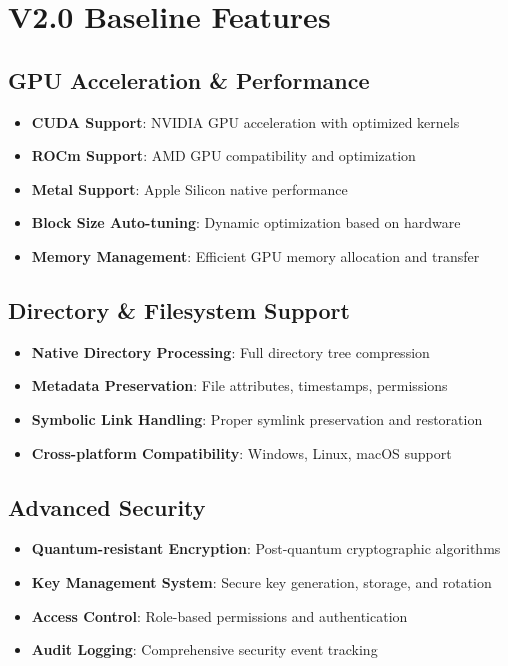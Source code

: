\documentclass[12pt,a4paper]{article}
\begin{document}
\section{V2.0 Baseline Features}

\subsection{GPU Acceleration \& Performance}
\begin{itemize}
    \item \textbf{CUDA Support}: NVIDIA GPU acceleration with optimized kernels
    \item \textbf{ROCm Support}: AMD GPU compatibility and optimization
    \item \textbf{Metal Support}: Apple Silicon native performance
    \item \textbf{Block Size Auto-tuning}: Dynamic optimization based on hardware
    \item \textbf{Memory Management}: Efficient GPU memory allocation and transfer
\end{itemize}

\subsection{Directory \& Filesystem Support}
\begin{itemize}
    \item \textbf{Native Directory Processing}: Full directory tree compression
    \item \textbf{Metadata Preservation}: File attributes, timestamps, permissions
    \item \textbf{Symbolic Link Handling}: Proper symlink preservation and restoration
    \item \textbf{Cross-platform Compatibility}: Windows, Linux, macOS support
\end{itemize}

\subsection{Advanced Security}
\begin{itemize}
    \item \textbf{Quantum-resistant Encryption}: Post-quantum cryptographic algorithms
    \item \textbf{Key Management System}: Secure key generation, storage, and rotation
    \item \textbf{Access Control}: Role-based permissions and authentication
    \item \textbf{Audit Logging}: Comprehensive security event tracking
\end{itemize}
\end{document}
